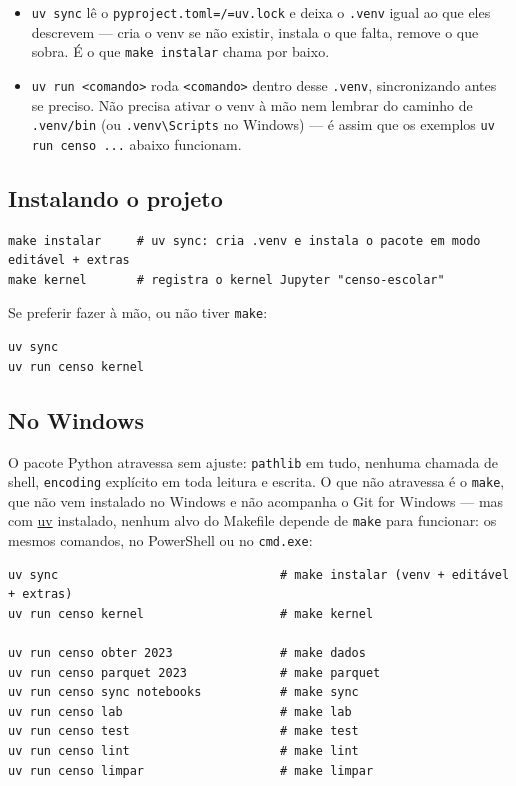 \documentclass[11pt]{article}
\begin{document}
\begin{itemize}
\item \texttt{uv sync} lê o \texttt{pyproject.toml=/=uv.lock} e deixa o \texttt{.venv} igual ao que eles
descrevem — cria o venv se não existir, instala o que falta, remove o que
sobra. É o que \texttt{make instalar} chama por baixo.
\item \texttt{uv run <comando>} roda \texttt{<comando>} dentro desse \texttt{.venv}, sincronizando antes
se preciso. Não precisa ativar o venv à mão nem lembrar do caminho de
\texttt{.venv/bin} (ou \texttt{.venv\textbackslash{}Scripts} no Windows) — é assim que os exemplos
\texttt{uv run censo ...} abaixo funcionam.
\end{itemize}
\subsection*{Instalando o projeto}
\label{sec:org9a70f86}

\begin{verbatim}
make instalar     # uv sync: cria .venv e instala o pacote em modo editável + extras
make kernel       # registra o kernel Jupyter "censo-escolar"
\end{verbatim}

Se preferir fazer à mão, ou não tiver \texttt{make}:

\begin{verbatim}
uv sync
uv run censo kernel
\end{verbatim}
\subsection*{No Windows}
\label{sec:org266169a}
O pacote Python atravessa sem ajuste: \texttt{pathlib} em tudo, nenhuma chamada de
shell, \texttt{encoding} explícito em toda leitura e escrita. O que não atravessa é o
\texttt{make}, que não vem instalado no Windows e não acompanha o Git for Windows —
mas com \href{https://docs.astral.sh/uv/}{uv} instalado, nenhum alvo do Makefile depende de \texttt{make} para funcionar:
os mesmos comandos, no PowerShell ou no \texttt{cmd.exe}:

\begin{verbatim}
uv sync                               # make instalar (venv + editável + extras)
uv run censo kernel                   # make kernel

uv run censo obter 2023               # make dados
uv run censo parquet 2023             # make parquet
uv run censo sync notebooks           # make sync
uv run censo lab                      # make lab
uv run censo test                     # make test
uv run censo lint                     # make lint
uv run censo limpar                   # make limpar
\end{verbatim}
\end{document}
